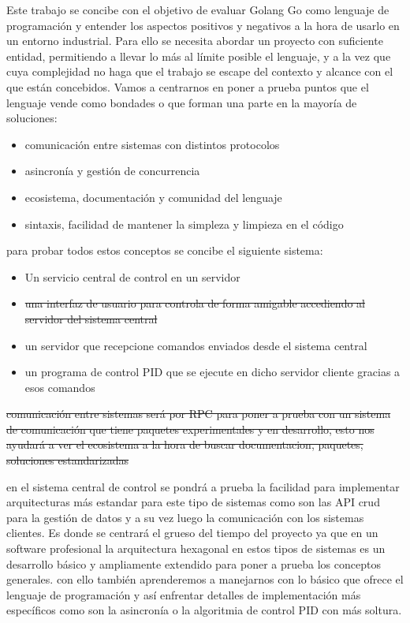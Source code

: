 
Este trabajo se concibe con el objetivo de evaluar Golang Go como lenguaje de programación y entender los aspectos positivos y negativos a la hora de usarlo en un entorno industrial. Para ello se necesita abordar un proyecto con suficiente entidad, permitiendo a llevar lo más al límite posible el lenguaje, y a la vez que cuya complejidad no haga que el trabajo se escape del contexto y alcance con el que están concebidos. Vamos a centrarnos en poner a prueba puntos que el lenguaje vende como bondades o que forman una parte en la mayoría de soluciones:

\begin{itemize}
	\item comunicación entre sistemas con distintos protocolos
	\item asincronía y gestión de concurrencia
	\item ecosistema, documentación y comunidad del lenguaje
	\item sintaxis, facilidad de mantener la simpleza y limpieza en el código
\end{itemize} 

para probar todos estos conceptos se concibe el siguiente sistema:

\begin{itemize}
	\item Un servicio central de control en un servidor
	\item \sout{una interfaz de usuario para controla de forma amigable accediendo al servidor del sistema central}
	\item un servidor que recepcione comandos enviados desde el sistema central
	\item un programa de control PID que se ejecute en dicho servidor cliente gracias a esos comandos
\end{itemize}


\sout{comunicación entre sistemas será por RPC para poner a prueba con un sistema de comunicación que tiene paquetes experimentales y en desarrollo, esto nos ayudará a ver el ecosistema a la hora de buscar documentacion, paquetes, soluciones estandarizadas}


en el sistema central de control se pondrá a prueba la facilidad para implementar arquitecturas más estandar para este tipo de sistemas como son las API crud para la gestión de datos y a su vez luego la comunicación con los sistemas clientes. Es donde se centrará el grueso del tiempo del proyecto ya que en un software profesional la arquitectura hexagonal en estos tipos de sistemas es un desarrollo básico y ampliamente extendido para poner a prueba los conceptos generales. con ello también aprenderemos a manejarnos con lo básico que ofrece el lenguaje de programación y así enfrentar detalles de implementación más específicos como son la asincronía o la algoritmia de control PID con más soltura.


